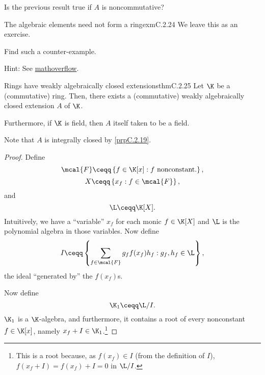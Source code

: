 \begin{exr}{}{}
	Is the previous result true if $A$ is noncommutative?
\end{exr}
\begin{exm}{The algebraic elements need not form a ring}{exmC.2.24}
	We leave this as an exercise.
	\begin{exr}[breakable=false]{}{}
		Find such a counter-example.
		\begin{rmk}
			Hint:  See \href{https://mathoverflow.net/questions/163749/algebraic closure-of-a-ring-is-not-a-ring}{mathoverflow}.
		\end{rmk}
	\end{exr}
\end{exm}
\begin{thm}{Rings have weakly algebraically closed extensions}{thmC.2.25}
	Let $\K$ be a (commutative) ring.  Then, there exists a (commutative) weakly algebraically closed extension $A$ of $\K$.
	
	Furthermore, if $\K$ is field, then $A$ itself taken to be a field.
	\begin{rmk}
		Note that $A$ is integrally closed by \cref{prpC.2.19}.
	\end{rmk}
	\begin{proof}
		Define
		\begin{equation}
			\mcal{F}\ceqq \left\{ f\in \K [x]:f\text{ nonconstant.}\right\} ,
		\end{equation}
		\begin{equation}
			X\ceqq \left\{ x_f:f\in \mcal{F}\right\} ,
		\end{equation}
			and
		\begin{equation}
			\L \ceqq \K [X].
		\end{equation}
		Intuitively, we have a ``variable'' $x_f$ for each monic $f\in \K [X]$ and $\L$ is the polynomial algebra in those variables.  Now define
		\begin{equation}
			I\ceqq \left\{ \sum _{f\in \mcal{F}}g_ff(x_f)h_f:g_f,h_f\in \L \right\} ,
		\end{equation}
		the ideal ``generated by'' the $f(x_f)$s.
		
		Now define
		\begin{equation}\label{eqnC.2.31}
			\K _1\ceqq \L /I.
		\end{equation}
		$\K _1$ is a $\K$-algebra, and furthermore, it contains a root of every nonconstant $f\in \K [x]$, namely $x_f+I\in \K _1$.\footnote{This is a root because, as $f(x_f)\in I$ (from the definition of $I$), $f(x_f+I)=f(x_f)+I=0$ in $\L /I$.}
		

\end{proof}
\end{thm}
